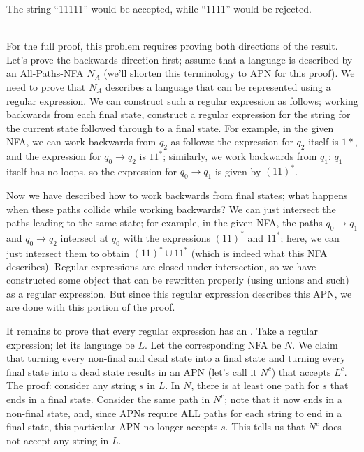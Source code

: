 \documentclass[solution, letterpaper]{cs121}
\begin{document}
The string ``11111'' would be accepted, while ``1111'' would be rejected. 
\\\\
\begin{solution}
\indent For the full proof, this problem requires proving both directions of the result.  Let's prove the backwards direction first; assume that a language is described by an All-Paths-NFA $N_A$ (we'll shorten this terminology to APN for this proof).  We need to prove that $N_A$ describes a language that can be represented using a regular expression.  We can construct such a regular expression as follows; working backwards from each final state, construct a regular expression for the string for the current state followed through to a final state.  For example, in the given NFA, we can work backwards from $q_2$ as follows: the expression for $q_2$ itself is $1*$, and the expression for $q_0 \rightarrow q_2$ is $11^*$; similarly, we work backwards from $q_1$: $q_1$ itself has no loops, so the expression for $q_0 \rightarrow q_1$ is given by $(11)^*$.  

Now we have described how to work backwards from final states; what happens when these paths collide while working backwards?  We can just intersect the paths leading to the same state; for example, in the given NFA, the paths $q_0 \rightarrow q_1$ and $q_0 \rightarrow q_2$ intersect at $q_0$ with the expressions $(11)^*$ and $11^*$; here, we can just intersect them to obtain $(11)^* \cup 11^*$ (which is indeed what this NFA describes).  Regular expressions are closed under intersection, so we have constructed some object that can be rewritten properly (using unions and such) as a regular expression.  But since this regular expression describes this APN, we are done with this portion of the proof.

It remains to prove that every regular expression has an .  Take a regular expression; let its language be $L$.  Let the corresponding NFA be $N$.  We claim that turning every non-final and dead state into a final state and turning every final state into a dead state results in an APN (let's call it $N^c$) that accepts $L^c$.  The proof: consider any string $s$ in $L$.  In $N$, there is at least one path for $s$ that ends in a final state.  Consider the same path in $N^c$; note that it now ends in a non-final state, and, since APNs require ALL paths for each string to end in a final state, this particular APN no longer accepts $s$.  This tells us that $N^c$ does not accept any string in $L$.


\end{solution}
\end{document}
